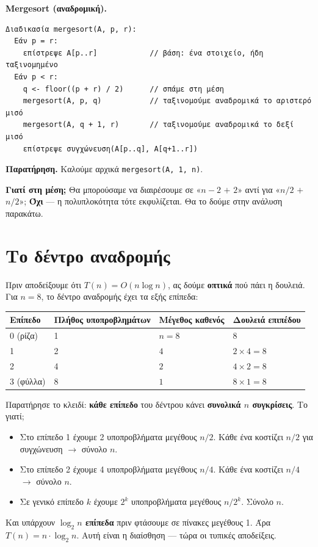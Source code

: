 \documentclass[11pt,a4paper]{article}
\begin{document}
\begin{examplebox}
\textbf{Mergesort (αναδρομική).}
\begin{codebox}
\begin{verbatim}
Διαδικασία mergesort(A, p, r):
  Εάν p = r:
    επίστρεψε A[p..r]            // βάση: ένα στοιχείο, ήδη ταξινομημένο
  Εάν p < r:
    q <- floor((p + r) / 2)      // σπάμε στη μέση
    mergesort(A, p, q)           // ταξινομούμε αναδρομικά το αριστερό μισό
    mergesort(A, q + 1, r)       // ταξινομούμε αναδρομικά το δεξί μισό
    επίστρεψε συγχώνευση(A[p..q], A[q+1..r])
\end{verbatim}
\end{codebox}
\textbf{Παρατήρηση.} Καλούμε αρχικά \texttt{mergesort(A, 1, n)}.

\textbf{Γιατί στη μέση;} Θα μπορούσαμε να διαιρέσουμε σε «$n-2$ $+$ $2$» αντί για
«$n/2$ $+$ $n/2$»; \textbf{Όχι} --- η πολυπλοκότητα τότε εκφυλίζεται. Θα το δούμε
στην ανάλυση παρακάτω.
\end{examplebox}

\section{Το δέντρο αναδρομής}

Πριν αποδείξουμε ότι $T(n) = O(n \log n)$, ας δούμε \textbf{οπτικά} πού πάει η
δουλειά. Για $n = 8$, το δέντρο αναδρομής έχει τα εξής επίπεδα:

\begin{center}
\begin{tabular}{@{}l l l l@{}}
\toprule
Επίπεδο & Πλήθος υποπροβλημάτων & Μέγεθος καθενός & Δουλειά επιπέδου \\
\midrule
0 (ρίζα)   & 1 & $n = 8$ & $8$ \\
1          & 2 & $4$     & $2 \times 4 = 8$ \\
2          & 4 & $2$     & $4 \times 2 = 8$ \\
3 (φύλλα)  & 8 & $1$     & $8 \times 1 = 8$ \\
\bottomrule
\end{tabular}
\end{center}

Παρατήρησε το κλειδί: \textbf{κάθε επίπεδο} του δέντρου κάνει \textbf{συνολικά $n$
συγκρίσεις}. Το γιατί;
\begin{itemize}
  \item Στο επίπεδο 1 έχουμε 2 υποπροβλήματα μεγέθους $n/2$. Κάθε ένα κοστίζει
  $n/2$ για συγχώνευση $\to$ σύνολο $n$.
  \item Στο επίπεδο 2 έχουμε 4 υποπροβλήματα μεγέθους $n/4$. Κάθε ένα κοστίζει
  $n/4$ $\to$ σύνολο $n$.
  \item Σε γενικό επίπεδο $k$ έχουμε $2^k$ υποπροβλήματα μεγέθους $n/2^k$. Σύνολο
  $n$.
\end{itemize}
Και υπάρχουν \textbf{$\log_2 n$ επίπεδα} πριν φτάσουμε σε πίνακες μεγέθους 1. Άρα
$T(n) = n \cdot \log_2 n$. Αυτή είναι η διαίσθηση --- τώρα οι τυπικές αποδείξεις.
\end{document}
